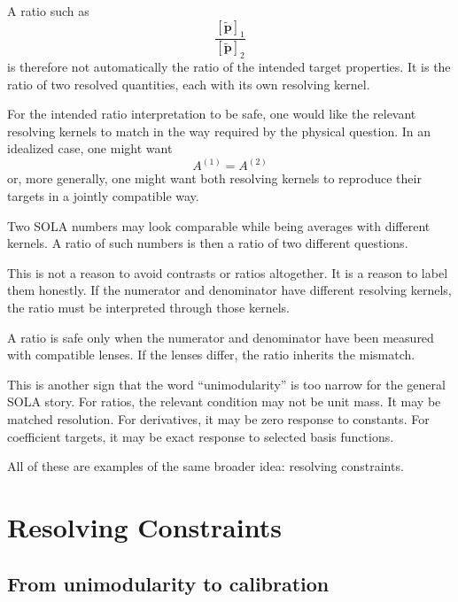 \documentclass[11pt,openany]{book}
\theoremstyle{definition}
\theoremstyle{remark}
\begin{document}
A ratio such as
\[
  \frac{[\widetilde{\mathbf p}]_1}{[\widetilde{\mathbf p}]_2}
\]
is therefore not automatically the ratio of the intended target properties. It is the ratio of two
resolved quantities, each with its own resolving kernel.

For the intended ratio interpretation to be safe, one would like the relevant resolving kernels to
match in the way required by the physical question. In an idealized case, one might want
\[
  A^{(1)}=A^{(2)}
\]
or, more generally, one might want both resolving kernels to reproduce their targets in a jointly
compatible way.

\begin{warningbox}
Two SOLA numbers may look comparable while being averages with different kernels. A ratio of
such numbers is then a ratio of two different questions.
\end{warningbox}

This is not a reason to avoid contrasts or ratios altogether. It is a reason to label them
honestly. If the numerator and denominator have different resolving kernels, the ratio must be
interpreted through those kernels.

\begin{intuitionbox}
A ratio is safe only when the numerator and denominator have been measured with compatible
lenses. If the lenses differ, the ratio inherits the mismatch.
\end{intuitionbox}

This is another sign that the word ``unimodularity'' is too narrow for the general SOLA story.
For ratios, the relevant condition may not be unit mass. It may be matched resolution. For
derivatives, it may be zero response to constants. For coefficient targets, it may be exact response
to selected basis functions.

All of these are examples of the same broader idea: resolving constraints.

\chapter{Resolving Constraints}

\section{From unimodularity to calibration}
\end{document}
